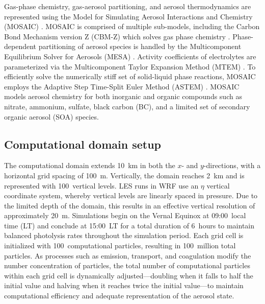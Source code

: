 \documentclass[acp, manuscript]{copernicus}
\begin{document}
Gas-phase chemistry, gas-aerosol partitioning, and aerosol
thermodynamics are represented using the Model for Simulating Aerosol
Interactions and Chemistry (MOSAIC) \citep{zaveri_model_2008}. MOSAIC
is comprised of multiple sub-models, including the Carbon Bond
Mechanism version Z (CBM-Z) which solves gas phase chemistry
\citep{zaveri_new_1999}. Phase-dependent partitioning of aerosol
species is handled by the Multicomponent Equilibrium Solver for
Aerosols (MESA) \citep{zaveri_computationally_2005}. Activity
coefficients of electrolytes are parameterized via the Multicomponent
Taylor Expansion Method (MTEM) \citep{zaveri_new_2005}. To efficiently
solve the numerically stiff set of solid-liquid phase reactions,
MOSAIC employs the Adaptive Step Time-Split Euler Method (ASTEM)
\citep{zaveri_model_2008}. MOSAIC models aerosol chemistry for both
inorganic and organic compounds such as nitrate, ammonium, sulfate,
black carbon (BC), and a limited set of secondary organic aerosol
(SOA) species.

\subsection{Computational domain setup}

The computational domain extends 10~km in both the $x$- and
$y$-directions, with a horizontal grid spacing of 100~m.  Vertically,
the domain reaches 2~km and is represented with 100~vertical
levels. LES runs in WRF use an $\eta$ vertical coordinate system,
whereby vertical levels are linearly spaced in pressure. Due to the
limited depth of the domain, this results in an effective vertical
resolution of approximately 20~m. Simulations begin on the Vernal
Equinox at 09:00~local time (LT) and conclude at 15:00~LT for a total
duration of 6~hours to maintain balanced photolysis rates throughout
the simulation period. Each grid cell is initialized with
100~computational particles, resulting in 100~million total
particles. As processes such as emission, transport, and coagulation
modify the number concentration of particles, the total number of
computational particles within each grid cell is dynamically
adjusted---doubling when it falls to half the initial value and
halving when it reaches twice the initial value---to maintain
computational efficiency and adequate representation of the aerosol
state. 
\end{document}
